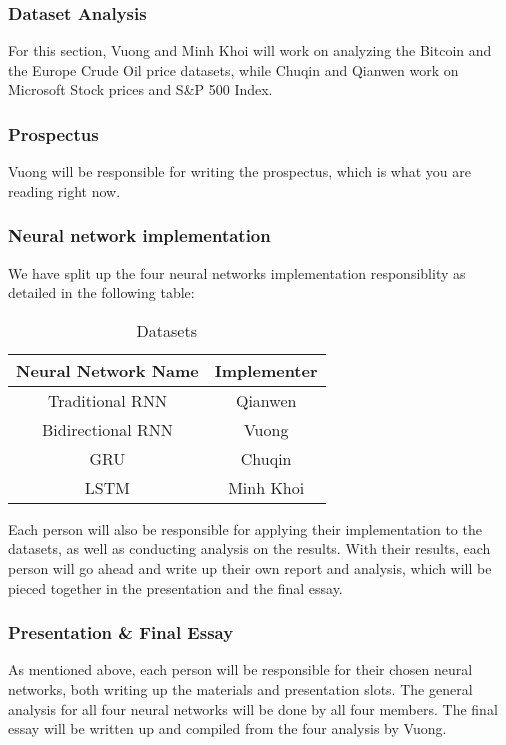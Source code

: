 \documentclass[letterpaper, 10 pt, conference]{ieeeconf}  %
\begin{document}
    \subsubsection{Dataset Analysis} For this section, Vuong and Minh Khoi will work on analyzing the Bitcoin and the Europe Crude Oil price datasets, while Chuqin and Qianwen work on Microsoft Stock prices and S\&P 500 Index.

    \subsubsection{Prospectus} Vuong will be responsible for writing the prospectus, which is what you are reading right now.

    \subsubsection{Neural network implementation} We have split up the four neural networks implementation responsiblity as detailed in the following table:
    \begin{table}[h!] \centering
        \caption{Datasets }
        \begin{threeparttable}
                \begin{tabular}{|c|c|}
                    \hline
                    Neural Network Name & Implementer\\
                    \hline
                    Traditional RNN & Qianwen\\
                    Bidirectional RNN & Vuong\\
                    GRU & Chuqin\\
                    LSTM & Minh Khoi\\
                    \hline
                \end{tabular}
        \end{threeparttable}
    \end{table}

    Each person will also be responsible for applying their implementation to the datasets, as well as conducting analysis on the results. With their results, each person will go ahead and write up their own report and analysis, which will be pieced together in the presentation and the final essay.

    \subsubsection{Presentation \& Final Essay} As mentioned above, each person will be responsible for their chosen neural networks, both writing up the materials and presentation slots. The general analysis for all four neural networks will be done by all four members. The final essay will be written up and compiled from the four analysis by Vuong.
\end{document}
